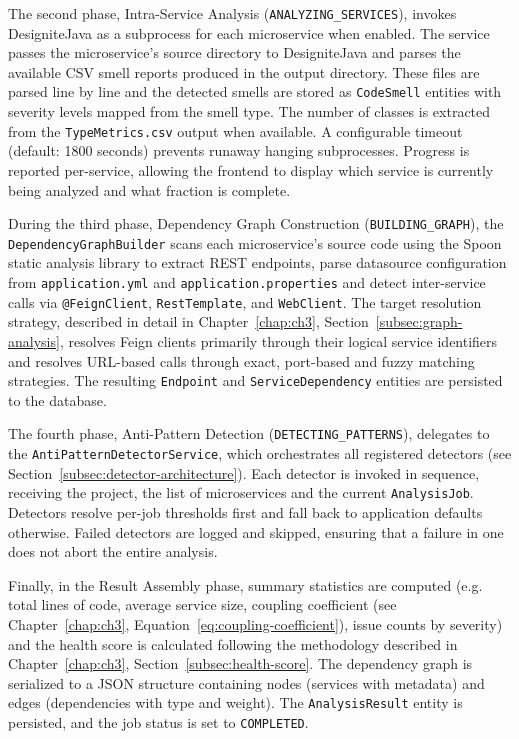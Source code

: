 The second phase, Intra-Service Analysis (\texttt{ANALYZING\_SERVICES}), invokes DesigniteJava as a subprocess for each microservice when enabled. The service passes the microservice's source directory to DesigniteJava and parses the available CSV smell reports produced in the output directory.
These files are parsed line by line and the detected smells are stored as \texttt{CodeSmell} entities with severity levels mapped from the smell type. The number of classes is extracted from the \texttt{TypeMetrics.csv} output when available. A configurable timeout (default: 1800 seconds) prevents runaway hanging subprocesses. Progress is reported per-service, allowing the frontend to display which service is currently being analyzed and what fraction is complete.

During the third phase, Dependency Graph Construction (\texttt{BUILDING\_GRAPH}), the \texttt{DependencyGraphBuilder} scans each microservice's source code using the Spoon static analysis library \cite{Pawlak2016} to extract REST endpoints, parse datasource configuration from \texttt{application.yml} and \texttt{application.properties} and detect inter-service calls via \texttt{@FeignClient}, \texttt{RestTemplate}, and \texttt{WebClient}. The target resolution strategy, described in detail in Chapter~\ref{chap:ch3}, Section~\ref{subsec:graph-analysis}, resolves Feign clients primarily through their logical service identifiers and resolves URL-based calls through exact, port-based and fuzzy matching strategies. The resulting \texttt{Endpoint} and \texttt{Ser\-viceDe\-pen\-den\-cy} entities are persisted to the database.

The fourth phase, Anti-Pattern Detection (\texttt{DETECTING\_PATTERNS}), delegates to the \texttt{AntiPatternDetectorService}, which orchestrates all registered detectors (see Section~\ref{subsec:detector-architecture}). Each detector is invoked in sequence, receiving the project, the list of microservices and the current \texttt{AnalysisJob}. Detectors resolve per-job thresholds first and fall back to application defaults otherwise. Failed detectors are logged and skipped, ensuring that a failure in one does not abort the entire analysis.

Finally, in the Result Assembly phase, summary statistics are computed (e.g. total lines of code, average service size, coupling coefficient (see Chapter~\ref{chap:ch3}, Equation~\ref{eq:coupling-coefficient}), issue counts by severity) and the health score is calculated following the methodology described in Chapter~\ref{chap:ch3}, Section~\ref{subsec:health-score}. The dependency graph is serialized to a JSON structure containing nodes (services with metadata) and edges (dependencies with type and weight). The \texttt{AnalysisResult} entity is persisted, and the job status is set to \texttt{COMPLETED}.

